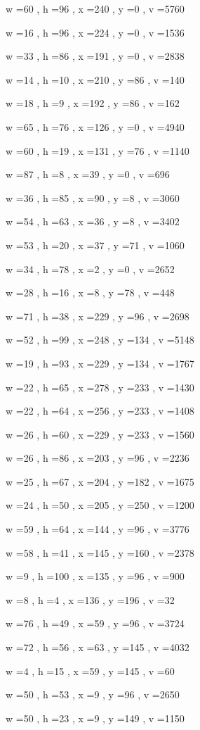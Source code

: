 \documentclass[11pt]{article}
\begin{document}
w =60 , h =96 , x =240 , y =0 , v =5760
\par
w =16 , h =96 , x =224 , y =0 , v =1536
\par
w =33 , h =86 , x =191 , y =0 , v =2838
\par
w =14 , h =10 , x =210 , y =86 , v =140
\par
w =18 , h =9 , x =192 , y =86 , v =162
\par
w =65 , h =76 , x =126 , y =0 , v =4940
\par
w =60 , h =19 , x =131 , y =76 , v =1140
\par
w =87 , h =8 , x =39 , y =0 , v =696
\par
w =36 , h =85 , x =90 , y =8 , v =3060
\par
w =54 , h =63 , x =36 , y =8 , v =3402
\par
w =53 , h =20 , x =37 , y =71 , v =1060
\par
w =34 , h =78 , x =2 , y =0 , v =2652
\par
w =28 , h =16 , x =8 , y =78 , v =448
\par
w =71 , h =38 , x =229 , y =96 , v =2698
\par
w =52 , h =99 , x =248 , y =134 , v =5148
\par
w =19 , h =93 , x =229 , y =134 , v =1767
\par
w =22 , h =65 , x =278 , y =233 , v =1430
\par
w =22 , h =64 , x =256 , y =233 , v =1408
\par
w =26 , h =60 , x =229 , y =233 , v =1560
\par
w =26 , h =86 , x =203 , y =96 , v =2236
\par
w =25 , h =67 , x =204 , y =182 , v =1675
\par
w =24 , h =50 , x =205 , y =250 , v =1200
\par
w =59 , h =64 , x =144 , y =96 , v =3776
\par
w =58 , h =41 , x =145 , y =160 , v =2378
\par
w =9 , h =100 , x =135 , y =96 , v =900
\par
w =8 , h =4 , x =136 , y =196 , v =32
\par
w =76 , h =49 , x =59 , y =96 , v =3724
\par
w =72 , h =56 , x =63 , y =145 , v =4032
\par
w =4 , h =15 , x =59 , y =145 , v =60
\par
w =50 , h =53 , x =9 , y =96 , v =2650
\par
w =50 , h =23 , x =9 , y =149 , v =1150
\par
\end{document}

